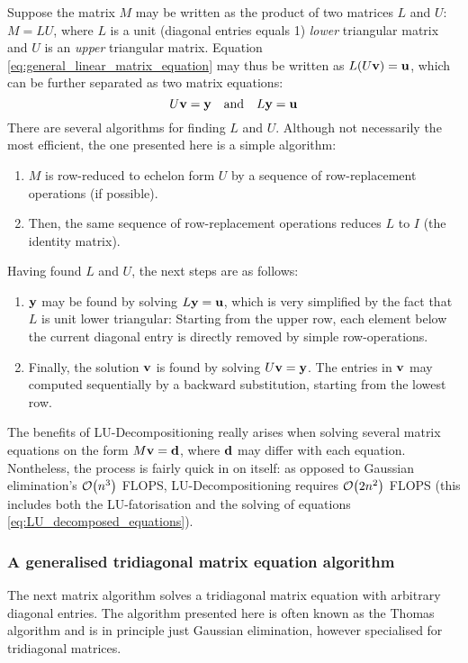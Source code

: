 \documentclass[reprint,english]{revtex4-1}
\begin{document}
Suppose the matrix \(M\) may be written as the product of two matrices \(L\) and \(U\): \(M=LU\), where \(L\) is a unit (diagonal entries equals 1) \emph{lower} triangular matrix and \(U\) is an \emph{upper} triangular matrix. Equation \eqref{eq:general_linear_matrix_equation} may thus be written as \(L(U\vb{v})=\vb{u}\), which can be further separated as two matrix equations:
\begin{equation}\label{eq:LU_decomposed_equations}
U\vb{v}=\vb{y}\qand L\vb{y}=\vb{u}
\end{equation}
There are several algorithms for finding \(L\) and \(U\). Although not necessarily the most efficient, the one presented here is a simple algorithm:
\begin{enumerate}
\item \(M\) is row-reduced to echelon form \(U\) by a sequence of row-replacement operations (if possible).
\item Then, the same sequence of row-replacement operations reduces \(L\) to \(I\) (the identity matrix).
\end{enumerate}
\newpage
\noindent Having found \(L\) and \(U\), the next steps are as follows:
\begin{enumerate}
\item \(\vb{y}\) may be found by solving \(L\vb{y}=\vb{u}\), which is very simplified by the fact that \(L\) is unit lower triangular: Starting from the upper row, each element below the current diagonal entry is directly removed by simple row-operations.
\item Finally, the solution \(\vb{v}\) is found by solving \(U\vb{v}=\vb{y}\). The entries in \(\vb{v}\) may computed sequentially by a backward substitution, starting from the lowest row.
\end{enumerate}
The benefits of LU-Decompositioning really arises when solving several matrix equations on the form \(M\vb{v}=\vb{d}\), where \(\vb{d}\) may differ with each equation. Nontheless, the process is fairly quick in on itself: as opposed to Gaussian elimination's \(\order{n^3}\) FLOPS, LU-Decompositioning requires \(\order{2n^2}\) FLOPS (this includes both the LU-fatorisation and the solving of equations \eqref{eq:LU_decomposed_equations}).
\subsubsection{A generalised tridiagonal matrix equation algorithm}\label{sec:general_tridiagonal_algorithm}
The next matrix algorithm solves a tridiagonal matrix equation with arbitrary diagonal entries. The algorithm presented here is often known as the Thomas algorithm and is in principle just Gaussian elimination, however specialised for tridiagonal matrices.
\end{document}
